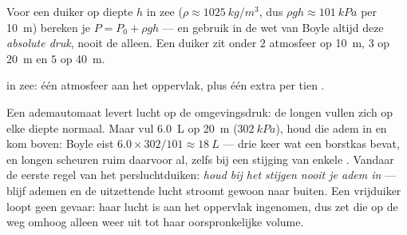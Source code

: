 \begin{method}\label{met:g10:pressure:dive}
Voor een duiker op diepte $h$ in zee ($\rho \approx \qty{1025}{kg/m^3}$,
dus $\rho g h \approx \qty{101}{kPa}$ per \qty{10}{m}) bereken je
$P = P_0 + \rho g h$ --- en gebruik in de wet van Boyle altijd deze
\emph{absolute druk}, nooit de  alleen. Een
duiker zit onder $2$ atmosfeer op \qty{10}{m}, $3$ op \qty{20}{m} en $5$
op \qty{40}{m}.
\end{method}

\begin{omfigure}

{\small {} in zee: één atmosfeer aan het oppervlak, plus één
extra per tien .}
\end{omfigure}

\begin{remark}\label{rem:g10:pressure:breath}
Een ademautomaat levert lucht op de omgevingsdruk: de longen vullen zich
op elke diepte normaal. Maar vul \qty{6.0}{L} op \qty{20}{m}
($\qty{302}{kPa}$), houd die adem in en kom boven: Boyle eist
$6.0 \times 302/101 \approx \qty{18}{L}$ --- drie keer wat een borstkas
bevat, en longen scheuren ruim daarvoor al, zelfs bij een stijging van
enkele . Vandaar de eerste regel van het persluchtduiken:
\emph{houd bij het stijgen nooit je adem in} --- blijf ademen en de
uitzettende lucht stroomt gewoon naar buiten. Een vrijduiker loopt geen
gevaar: haar lucht is aan het oppervlak ingenomen, dus zet die op de weg
omhoog alleen weer uit tot haar oorspronkelijke volume.
\end{remark}

